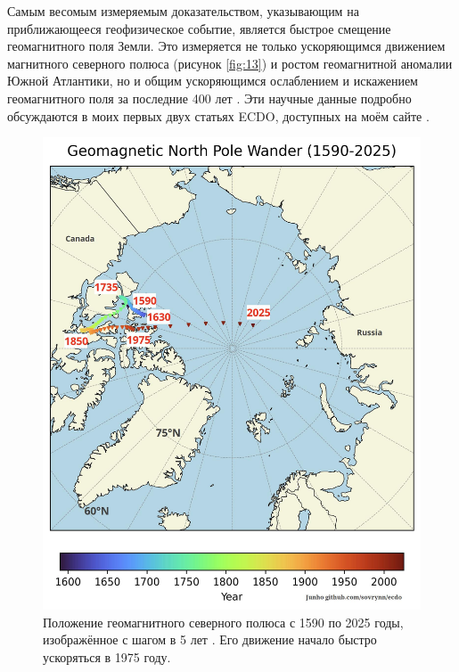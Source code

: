 \documentclass[10pt,twocolumn,letterpaper]{article}
\begin{document}
Самым весомым измеряемым доказательством, указывающим на приближающееся геофизическое событие, является быстрое смещение геомагнитного поля Земли. Это измеряется не только ускоряющимся движением магнитного северного полюса (рисунок \ref{fig:13}) и ростом геомагнитной аномалии Южной Атлантики, но и общим ускоряющимся ослаблением и искажением геомагнитного поля за последние 400 лет \cite{3}. Эти научные данные подробно обсуждаются в моих первых двух статьях ECDO, доступных на моём сайте \cite{3}.

\begin{figure}[t]
\begin{center}
   \includegraphics[width=1\linewidth]{npw.jpg}
\end{center}
   \caption{Положение геомагнитного северного полюса с 1590 по 2025 годы, изображённое с шагом в 5 лет \cite{41}. Его движение начало быстро ускоряться в 1975 году.}
\label{fig:13}
\label{fig:onecol}
\end{figure}
\end{document}
